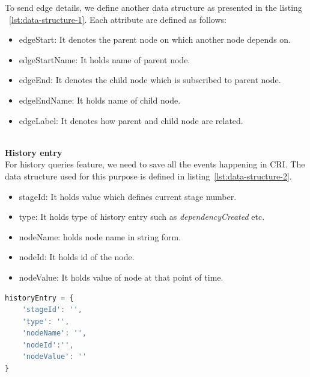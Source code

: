 To send edge details, we define another data structure as presented in the listing ~\ref{lst:data-structure-1}. Each attribute are defined as follows:
\begin{itemize}
	\item edgeStart: It denotes the parent node on which another node depends on. 
	\item edgeStartName: It holds name of parent node. 
	\item edgeEnd: It  denotes the child node which is subscribed to parent node.
	\item edgeEndName: It holds name of child node.
	\item edgeLabel: It denotes how parent and child node are related. 
\end{itemize}
\leavevmode
\\
\textbf{History entry}
\\
For history queries feature, we need to save all the events happening in CRI. The data structure used for this purpose is defined in listing~\ref{lst:data-structure-2}.

\begin{itemize}
	\item stageId: It holds value which defines current stage number.
	\item type: It holds type of history entry such as \textit{dependencyCreated} etc.
	\item nodeName: holds node name in string form.
	\item nodeId: It holds id of the node.
	\item nodeValue: It holds value of node at that point of time.
\end{itemize}

\begin{lstlisting}[language=JavaScript, caption=History entry Data structure, label={lst:data-structure-2}]
historyEntry = {
	'stageId': '',
	'type': '',
	'nodeName': '',
	'nodeId':'',
	'nodeValue': ''
}

\end{lstlisting}
\leavevmode
